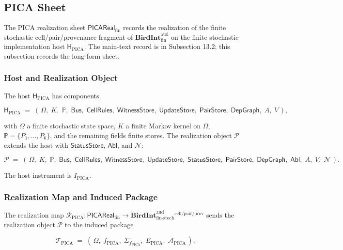 \documentclass[11pt]{article}
\theoremstyle{definition}
\begin{document}
\subsection{PICA Sheet}

The PICA realization sheet \(\mathsf{PICAReal}_{\mathrm{fin}}\) records the realization of the finite stochastic cell/pair/provenance fragment of \(\mathbf{BirdInt}^{\mathrm{aud}}_{\mathrm{fin}}\) on the finite stochastic implementation host \(\mathsf H_{\mathrm{PICA}}\). The main-text record is in Subsection 13.2; this subsection records the long-form sheet.

\subsubsection{Host and Realization Object}

The host \(\mathsf H_{\mathrm{PICA}}\) has components

\[
\mathsf H_{\mathrm{PICA}}\;=\;(\,\Omega,\;K,\;\mathbb P,\;\mathsf{Bus},\;\mathsf{CellRules},\;\mathsf{WitnessStore},\;\mathsf{UpdateStore},\;\mathsf{PairStore},\;\mathsf{DepGraph},\;A,\;V\,),
\]

with \(\Omega\) a finite stochastic state space, \(K\) a finite Markov kernel on \(\Omega\), \(\mathbb P=\{P_{1},\ldots,P_{6}\}\), and the remaining fields finite stores. The realization object \(\mathcal P\) extends the host with \(\mathsf{StatusStore}\), \(\mathsf{Abl}\), and \(\mathcal N\):

\[
\mathcal P\;=\;(\,\Omega,\;K,\;\mathbb P,\;\mathsf{Bus},\;\mathsf{CellRules},\;\mathsf{WitnessStore},\;\mathsf{UpdateStore},\;\mathsf{StatusStore},\;\mathsf{PairStore},\;\mathsf{DepGraph},\;\mathsf{Abl},\;A,\;V,\;\mathcal N\,).
\]

The host instrument is \(I_{\mathrm{PICA}}\).

\subsubsection{Realization Map and Induced Package}

The realization map \(\mathcal R_{\mathrm{PICA}}:\mathsf{PICAReal}_{\mathrm{fin}}\to\mathbf{BirdInt}^{\mathrm{aud}}_{\mathrm{fin\text{-}stoch}}{}^{\mathrm{cell}/\mathrm{pair}/\mathrm{prov}}\) sends the realization object \(\mathcal P\) to the induced package

\[
\mathcal T_{\mathrm{PICA}}\;=\;(\,\Omega,\;f_{\mathrm{PICA}},\;\Sigma_{f_{\mathrm{PICA}}},\;E_{\mathrm{PICA}},\;\mathcal A_{\mathrm{PICA}}\,),
\]
\end{document}
